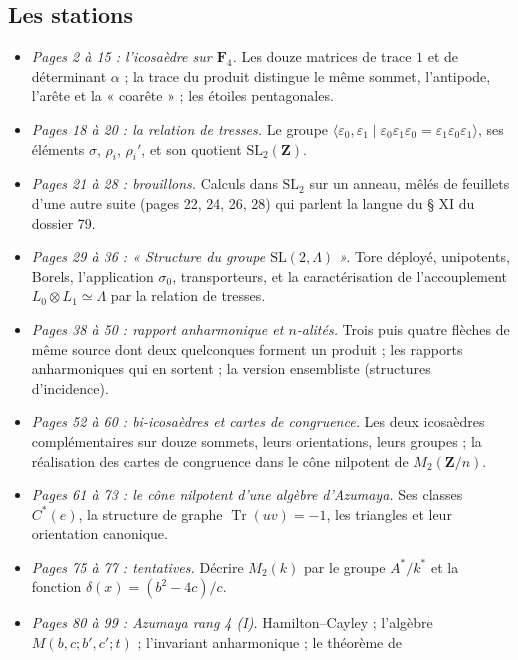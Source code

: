 \documentclass[11pt,a4paper]{article}
\begin{document}
\subsection*{Les stations}

\begin{itemize}
  \item \emph{Pages 2 à 15 : l'icosaèdre sur $\mathbf{F}_4$.} Les douze
    matrices de trace $1$ et de déterminant $\alpha$ ; la trace du produit
    distingue le même sommet, l'antipode, l'arête et la « coarête » ; les
    étoiles pentagonales.
  \item \emph{Pages 18 à 20 : la relation de tresses.} Le groupe
    $\langle \varepsilon_0, \varepsilon_1 \mid \varepsilon_0\varepsilon_1\varepsilon_0
    = \varepsilon_1\varepsilon_0\varepsilon_1\rangle$, ses éléments $\sigma$,
    $\rho_i$, $\rho_i'$, et son quotient $\mathrm{SL}_2(\mathbf{Z})$.
  \item \emph{Pages 21 à 28 : brouillons.} Calculs dans $\mathrm{SL}_2$ sur un
    anneau, mêlés de feuillets d'une autre suite (pages 22, 24, 26, 28) qui
    parlent la langue du § XI du dossier 79.
  \item \emph{Pages 29 à 36 : « Structure du groupe $\mathrm{SL}(2,
    \Lambda)$ ».} Tore déployé, unipotents, Borels, l'application $\sigma_0$,
    transporteurs, et la caractérisation de l'accouplement $L_0 \otimes L_1
    \simeq \Lambda$ par la relation de tresses.
  \item \emph{Pages 38 à 50 : rapport anharmonique et $n$-alités.} Trois
    puis quatre flèches de même source dont deux quelconques forment un
    produit ; les rapports anharmoniques qui en sortent ; la version
    ensembliste (structures d'incidence).
  \item \emph{Pages 52 à 60 : bi-icosaèdres et cartes de congruence.} Les deux
    icosaèdres complémentaires sur douze sommets, leurs orientations, leurs
    groupes ; la réalisation des cartes de congruence dans le cône nilpotent de
    $M_2(\mathbf{Z}/n)$.
  \item \emph{Pages 61 à 73 : le cône nilpotent d'une algèbre d'Azumaya.} Ses
    classes $C^{*}(e)$, la structure de graphe $\operatorname{Tr}(uv) = -1$, les
    triangles et leur orientation canonique.
  \item \emph{Pages 75 à 77 : tentatives.} Décrire $M_2(k)$ par le groupe
    $A^{*}/k^{*}$ et la fonction $\delta(x) = (b^2 - 4c)/c$.
  \item \emph{Pages 80 à 99 : Azumaya rang 4 (I).} Hamilton--Cayley ;
    l'algèbre $M(b, c; b', c'; t)$ ; l'invariant anharmonique ; le théorème de

\end{itemize}
\end{document}
